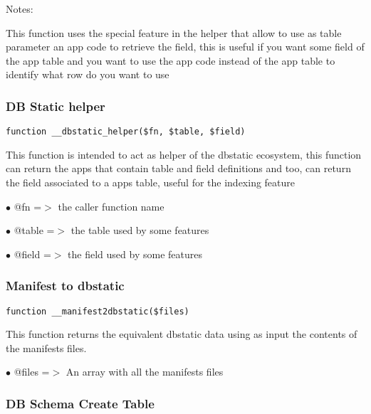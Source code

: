 \documentclass[a4paper]{article}
\begin{document}
Notes:

This function uses the special feature in the helper that allow to
use as table parameter an app code to retrieve the field, this is
useful if you want some field of the app table and you want to use
the app code instead of the app table to identify what row do you
want to use

\hypertarget{toc427}{}
\subsubsection{DB Static helper}

\begin{lstlisting}
function __dbstatic_helper($fn, $table, $field)
\end{lstlisting}

This function is intended to act as helper of the dbstatic ecosystem, this
function can return the apps that contain table and field definitions and
too, can return the field associated to a apps table, useful for the
indexing feature

\begin{compactitem}
\item[\color{myblue}$\bullet$] @fn    =$>$ the caller function name
\item[\color{myblue}$\bullet$] @table =$>$ the table used by some features
\item[\color{myblue}$\bullet$] @field =$>$ the field used by some features
\end{compactitem}

\hypertarget{toc428}{}
\subsubsection{Manifest to dbstatic}

\begin{lstlisting}
function __manifest2dbstatic($files)
\end{lstlisting}

This function returns the equivalent dbstatic data using as input the contents
of the manifests files.

\begin{compactitem}
\item[\color{myblue}$\bullet$] @files =$>$ An array with all the manifests files
\end{compactitem}

\hypertarget{toc429}{}
\subsubsection{DB Schema Create Table}
\end{document}
